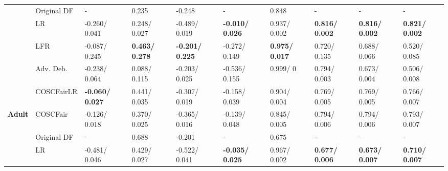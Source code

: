 \begin{table*}[h!]
\begin{small}
{\begin{minipage}{\textwidth}
\begin{tabular}{|c|l|l|l|l|l|l|l|l|l|}
                                        & Original DF                        & -                      & 0.235                 & -0.248                 & -                      & 0.848                 & -                     & -                     & -                     \\ \cline{2-10} 
                                        & LR                                 & -0.260/ 0.041          & 0.248/ 0.027          & -0.489/ 0.019          & \textbf{-0.010/ 0.026} & 0.937/ 0.002          & \textbf{0.816/ 0.002} & \textbf{0.816/ 0.002} & \textbf{0.821/ 0.002} \\ \cline{2-10} 
                                        & LFR                                & -0.087/ 0.245          & \textbf{0.463/ 0.278} & \textbf{-0.201/ 0.225} & -0.272/ 0.149          & \textbf{0.975/ 0.017} & 0.720/ 0.135          & 0.688/ 0.066          & 0.520/ 0.085          \\ \cline{2-10} 
                                        & Adv. Deb.                          & -0.238/ 0.064          & 0.088/ 0.115          & -0.203/ 0.025          & -0.536/ 0.155          & 0.999/ 0              & 0.794/ 0.003          & 0.673/ 0.004          & 0.506/ 0.008          \\ \cline{2-10} 
                                        & \cellcolor[HTML]{D9D9D9}COSCFairLR & \textbf{-0.060/ 0.027} & 0.441/ 0.035          & -0.307/ 0.019          & -0.158/ 0.039          & 0.904/ 0.004          & 0.769/ 0.005          & 0.769/ 0.005          & 0.766/ 0.007          \\ \cline{2-10} 
\multirow{-6}{*}{\textbf{Adult}}        & \cellcolor[HTML]{D9D9D9}COSCFair   & -0.126/ 0.018          & 0.370/ 0.025          & -0.365/ 0.016          & -0.139/ 0.048          & 0.845/ 0.005          & 0.794/ 0.006          & 0.794/ 0.006          & 0.793/ 0.007          \\ \hline
                                        & Original DF                        & -                      & 0.688                 & -0.201                 & -                      & 0.675                 & -                     & -                     & -                     \\ \cline{2-10} 
                                        & LR                                 & -0.481/ 0.046          & 0.429/ 0.027          & -0.522/ 0.041          & \textbf{-0.035/ 0.025} & 0.967/ 0.002          & \textbf{0.677/ 0.006} & \textbf{0.673/ 0.007} & \textbf{0.710/ 0.007} \\ \cline{2-10} 

\end{tabular}
\end{minipage}}
\end{small}
\end{table*}
